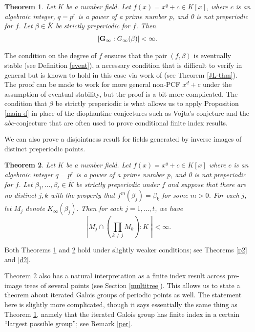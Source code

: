 \documentclass[11pt]{amsart}
\newtheorem{thm}{Theorem}
\theoremstyle{definition}
\theoremstyle{definition}
\numberwithin{thm}{section}
\numberwithin{equation}{thm}
\newcommand{\Kbar}{\ensuremath {\overline K}}
\begin{document}
\begin{thm}\label{p-theorem}
  Let $K$ be a number field.  Let $f(x) = x^q + c \in K[x]$, where $c$
  is an algebraic integer, $q = p^r$ is a power of a prime number
  $p$, and 0 is not preperiodic for $f$. Let $\beta\in \Kbar$ be strictly
  preperiodic for $f$.  Then
  \[ [{\bf G}_\infty: G_\infty(\beta)] < \infty. \]
\end{thm}

The condition on the degree of $f$ ensures that the pair $(f,\beta)$
is eventually stable (see Definition \ref{event}), a necessary
condition that is difficult to verify in general but is known to hold
in this case via work of \cite{RafeAlon} (see Theorem \ref{JL-thm}).
The proof can be made to work for more general non-PCF $x^d + c$ under
the assumption of eventual stability, but the proof is a bit more
complicated.  The condition that $\beta$ be strictly preperiodic is
what allows us to apply Proposition \ref{main-d} in place of the
diophantine conjectures such as Vojta's conjeture and the
$abc$-conjecture that are often used to prove conditional finite index
results.

We can also prove a disjointness result for fields generated by
inverse images of distinct preperiodic points.

\begin{thm}\label{disjoint-theorem} Let $K$ be a number field.  Let $f(x) = x^q + c \in K[x]$ where $c$
  is an algebraic integer $q = p^r$ is a power of a prime number $p$,
  and 0 is not preperiodic for $f$.  Let $\beta_1, \dots, \beta_t \in \Kbar$ be
  strictly preperiodic under $f$ and suppose that there are no
  distinct $j, k$ with the property that $f^m(\beta_j) = \beta_k$ for
  some $m >0$.  For each $j$, let $M_j$ denote $K_\infty(\beta_j)$.
  Then for each $j=1,\dots, t$, we have 
\[ \left[M_j \cap \left(\prod_{k \ne j} M_k\right): K\right] < \infty .\]
\end{thm}

Both Theorems \ref{p-theorem} and \ref{disjoint-theorem} hold under
slightly weaker conditions; see Theorems \ref{p2} and \ref{d2}.  

Theorem \ref{disjoint-theorem} also has a natural interpretation as a finite
index result across pre-image trees of several points (see Section
\ref{multitree}). This allows us to state a theorem about iterated
Galois groups of periodic points as well.  The statement here is
slightly more complicated, though it says essentially the same thing
as Theorem \ref{p-theorem},
namely that the iterated Galois group has finite index in a certain
``largest possible group''; see Remark \ref{per}.
\end{document}
